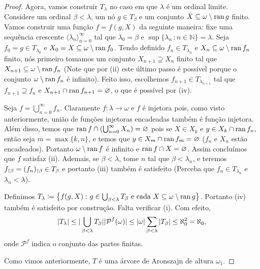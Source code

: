 \documentclass[a4paper]{article}
\begin{document}
\begin{proof}
   Agora, vamos construir \(T_{\lambda}\) no caso em que \(\lambda\) é um ordinal
   limite. Considere um ordinal \(\beta< \lambda\), um nó \(g \in T_{\beta}\) e
   um conjunto \(X \subseteq \omega\setminus \operatorname{ran} g\) finito. Vamos construir uma
   função \(f = f(g, X)\) da seguinte maneira: fixe uma sequência
   crescente \(\langle \lambda_n \rangle_{n=0}^{\infty}\) tal que \(\lambda_0  =\beta\)
   e \(\sup\{\lambda_n\,\colon n \in \mathbb{N}\} = \lambda\). Seja
   \(f_0 = g \in T_{\lambda_0}\) e \(X_0 = X \subseteq \omega\setminus \operatorname{ran} f_0\). Tendo
   definido \(f_n \in T_{\lambda_n}\) e \(X_n\subseteq \omega\setminus \operatorname{ran} f_n\)
   finito, nós primeiro tomamos um conjunto \(X_{n+1} \supsetneq X_n\) finito tal
   que \(X_{n+1} \subseteq \omega\setminus \operatorname{ran} f_n\) (Note que por (ii) este último passo é
   possível porque o conjunto \(\omega\setminus\operatorname{ran} f_n\) é infinito).
   Feito isso, escolhemos \(f_{n+1} \in T_{\lambda_{n+1}}\) tal que \(f_{n+1}
   \supseteq f_n\) e  \(X_{n+1} \cap \operatorname{ran} f_{n+1} = \varnothing\), o que é possível
   por (iv).
   
   Seja \(f = \bigcup_{n = 0}^{\infty}f_n\). Claramente \(f\colon \lambda\to
   \omega\) e  \(f\)  é injetora pois, como visto anteriormente, união de
   funções injetoras  encadeadas também é função injetora. Além disso, temos que
   \(\operatorname{ran} f \cap (\bigcup_{n = 0}^{\infty} X_n)= \varnothing\) pois se \(X\in
   X_k\) e  \(y\in X_k\cap\operatorname{ran} f_n,\) então seja \(m=\max\{k,n\}\), e temos que
   \(y\in X_m\cap\operatorname{ran} f_m=\varnothing\) (\(f_n\) e \(X_n\) estão encadeados).
   Portanto  \(\omega\setminus\operatorname{ran} f\) é infinito e \(\operatorname{ran} f \cap X
   =\varnothing\). Assim concluímos que \(f\) satisfaz (ii). Ademais, se  \(\beta <
   \lambda\), tome \(n\) tal que \(\beta < \lambda_n\), e teremos
   \(f_{\upharpoonright \beta}= (f_{n})_{\upharpoonright \beta}\in T_\beta\) e portanto (iii)
   também é satisfeito (Perceba que \(f_n\in T_{\lambda_n}\) e \(\lambda_n<\lambda\)).
   
   Definimos \(T_\lambda\coloneqq\big\{f(g,X)\,\colon g\in\bigcup_{\beta <
     \lambda} T_{\beta} \text{ e cada } X \subseteq \omega\setminus\operatorname{ran}
   g\big\}\). Portanto  (iv) também é satisfeito por construção. Falta verificar
   (i). Com efeito,
   \[\vert T_\lambda \vert\leq\vert \bigcup_{\beta<\lambda}T_{\beta} \vert\vert \mathcal
     P^f(\omega) \vert \le \vert \omega \vert\sum_{\beta<\lambda}\vert T_{\beta} \vert
   \le \aleph_0^2=\aleph_0,\] onde \(\mathcal P^f\) indica o conjunto das partes finitas.
   
   Como vimos anteriormente, \(T\) é uma árvore de Aronszajn de altura \(\omega_1\).
\end{proof}
\end{document}
